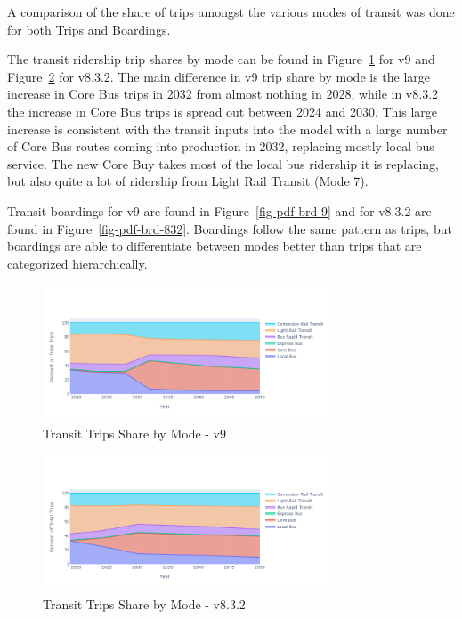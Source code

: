 \documentclass[
  letterpaper,
  DIV=11,
  numbers=noendperiod]{scrreprt}
\begin{document}
A comparison of the share of trips amongst the various modes of transit
was done for both Trips and Boardings.

The transit ridership trip shares by mode can be found in
Figure~\ref{fig-pdf-shr-tr-all-9} for v9 and
Figure~\ref{fig-pdf-shr-tr-all-832} for v8.3.2. The main difference in
v9 trip share by mode is the large increase in Core Bus trips in 2032
from almost nothing in 2028, while in v8.3.2 the increase in Core Bus
trips is spread out between 2024 and 2030. This large increase is
consistent with the transit inputs into the model with a large number of
Core Bus routes coming into production in 2032, replacing mostly local
bus service. The new Core Buy takes most of the local bus ridership it
is replacing, but also quite a lot of ridership from Light Rail Transit
(Mode 7).

Transit boardings for v9 are found in Figure~\ref{fig-pdf-brd-9} and for
v8.3.2 are found in Figure~\ref{fig-pdf-brd-832}. Boardings follow the
same pattern as trips, but boardings are able to differentiate between
modes better than trips that are categorized hierarchically.

\begin{figure}[H]

{\centering \includegraphics[width=0.76\textwidth,height=\textheight]{v9x/v900/whats-new/_pictures/pdf-shr-tr-all-9.png}

}

\caption{\label{fig-pdf-shr-tr-all-9}Transit Trips Share by Mode - v9}

\end{figure}

\begin{figure}[H]

{\centering \includegraphics[width=0.76\textwidth,height=\textheight]{v9x/v900/whats-new/_pictures/pdf-shr-tr-all-832.png}

}

\caption{\label{fig-pdf-shr-tr-all-832}Transit Trips Share by Mode -
v8.3.2}

\end{figure}
\end{document}
